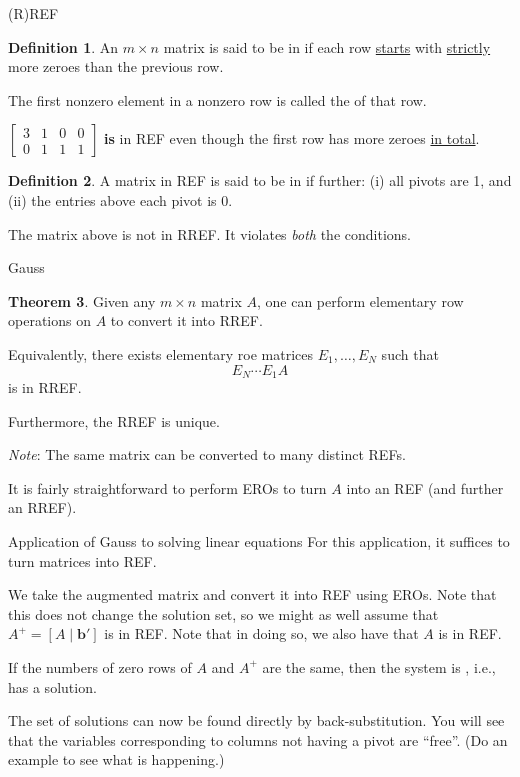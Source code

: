 \documentclass[dvipsnames]{beamer}
\theoremstyle{definition}
\newtheorem{thm}{Theorem}
\newtheorem{defn}[thm]{Definition}
\begin{document}
\begin{frame}{(R)REF}
    \begin{defn}
         An $m \times n$ matrix is said to be in  if \newline
         each row \underline{starts} with \underline{strictly} more zeroes than the previous row. \pause

         The first nonzero element in a nonzero row is called the  of that row.
     \end{defn} \pause
    $\begin{bmatrix}
        \boxed{3} & 1 & 0 & 0 \\
        0 & \boxed{1} & 1 & 1
    \end{bmatrix}$ \pause \textbf{is} in REF even though the first row has more zeroes \underline{in total}.

    \begin{defn}
        A matrix in REF is said to be in  if further: \pause (i) all pivots are 1, \pause and (ii) the entries above each pivot is $0$.
    \end{defn} \pause

    The matrix above is not in RREF. \pause It violates \emph{both} the conditions.
\end{frame}
\begin{frame}{Gauss}
    \begin{thm}
        Given any $m \times n$ matrix $A$, one can perform elementary row operations on $A$ to convert it into RREF. \pause

        Equivalently, there exists elementary roe matrices $E_{1}, \ldots, E_{N}$ such that
        \begin{equation*} 
            E_{N} \cdots E_{1} A
        \end{equation*}
        is in RREF. \pause

        Furthermore, the RREF is unique.
    \end{thm} \pause
    \emph{Note}: The same matrix can be converted to many distinct REFs. \pause

    It is fairly straightforward to perform EROs to turn $A$ into an REF (and further an RREF).
\end{frame}
\begin{frame}{Application of Gauss to solving linear equations}
    For this application, it suffices to turn matrices into REF. \pause

    We take the augmented matrix and convert it into REF using EROs. \pause Note that this does not change the solution set, so we might as well assume that $A^{+} = [A \mid \mathbf{b}']$ is in REF. \pause 
    Note that in doing so, we also have that $A$ is in REF. \pause

    If the numbers of zero rows of $A$ and $A^{+}$ are the same, then the system is , i.e., has a solution. \pause
    
    The set of solutions can now be found directly by back-substitution. \pause You will see that the variables corresponding to columns not having a pivot are ``free''. \pause (Do an example to see what is happening.) 
\end{frame}
\end{document}
